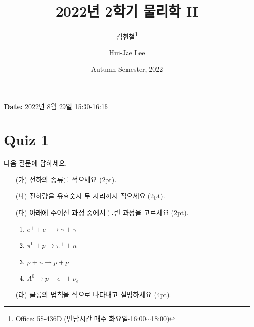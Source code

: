 \documentclass[floatfix,nofootinbib,superscriptaddress,fleqn,notitlepage]{revtex4-2}
\begin{document}
\title{\Large 2022년 2학기 물리학 II}
\author{김현철\footnote{Office: 5S-436D (면담시간 매주
    화요일-16:00$\sim$18:00)}} 
\author{Hui-Jae Lee} 
\date{Autumn Semester, 2022}

\maketitle

{\color{red} {\bf Date:} 2022년 8월 29일  15:30-16:15 }
\vspace{1.cm}

\section*{\large Quiz 1}
다음 질문에 답하세요.
\begin{itemize}
\item[(가)] 전하의 종류를 적으세요 (2pt). 
\item[(나)] 전하량을 유효숫자 두 자리까지 적으세요 (2pt). 
\item[(다)] 아래에 주어진 과정 중에서 틀린 과정을 고르세요 (2pt).
  \begin{enumerate}
  \item $e^++e^-\to \gamma + \gamma$
  \item $\pi^0 + p \to \pi^+ + n$
  \item $p+n\to p+p$
  \item $\Lambda^0\to p + e^- +\bar{\nu}_e$
  \end{enumerate}
\item[(라)] 쿨롱의 법칙을 식으로 나타내고 설명하세요 (4pt). 
\end{itemize}
\vspace{1.cm}
\end{document}

